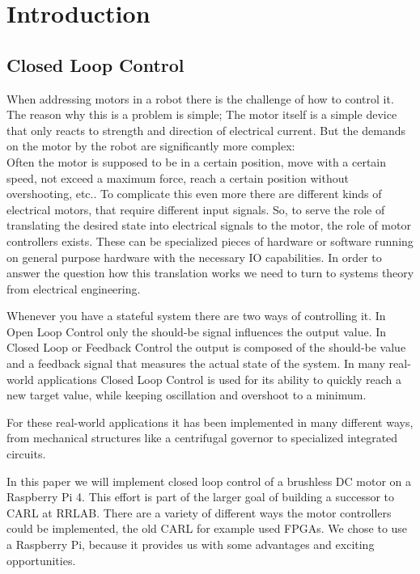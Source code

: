 \chapter{Introduction}
\label{chap:introduction}

\section{Closed Loop Control}
\label{sec:introduction:clc}

When addressing motors in a robot there is the challenge of how to control it.
The reason why this is a problem is simple;
The motor itself is a simple device that only reacts to strength and direction of electrical current.
But the demands on the motor by the robot are significantly more complex:\\
Often the motor is supposed to be in a certain position, move with a certain speed, not exceed a maximum force, reach a certain position without overshooting, etc..
To complicate this even more there are different kinds of electrical motors, that require different input signals.
So, to serve the role of translating the desired state into electrical signals to the motor, the role of motor controllers exists.
These can be specialized pieces of hardware or software running on general purpose hardware with the necessary IO capabilities.
In order to answer the question how this translation works we need to turn to systems theory from electrical engineering.

Whenever you have a stateful system there are two ways of controlling it.
In Open Loop Control only the should-be signal influences the output value.
In Closed Loop or Feedback Control the output is composed of the should-be value and a feedback signal that measures the actual state of the system.
In many real-world applications Closed Loop Control is used for its ability to quickly reach a new target value, while keeping oscillation and overshoot to a minimum.

For these real-world applications it has been implemented in many different ways,
from mechanical structures like a centrifugal governor to specialized integrated circuits.

In this paper we will implement closed loop control of a brushless DC motor on a Raspberry Pi 4.
This effort is part of the larger goal of building a successor to CARL \cite{CARL} at RRLAB.
There are a variety of different ways the motor controllers could be implemented, the old CARL for example used FPGAs.
We chose to use a Raspberry Pi, because it provides us with some advantages and exciting opportunities.

